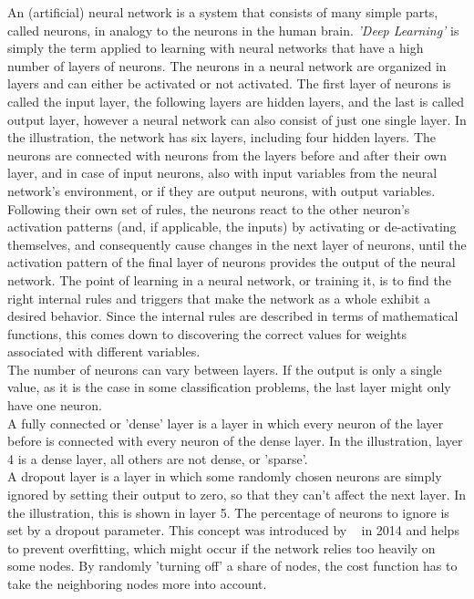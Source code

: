 \documentclass[
	a4paper,
	pagesize,
	pdftex,
	12pt,
	twoside, %
	BCOR=5mm, %
	ngerman,
	fleqn,
	final,
	]{scrartcl}
\begin{document}
An (artificial) neural network is a system that consists of many simple parts, called neurons, in analogy to the neurons in the human brain. \textit{'Deep Learning'} is simply the term applied to learning with neural networks that have a high number of layers of neurons. The neurons in a neural network are organized in layers and can either be activated or not activated. The first layer of neurons is called the input layer, the following layers are hidden layers, and the last is called output layer, however a neural network can also consist of just one single layer. In the illustration, the network has six layers, including four hidden layers. The neurons are connected with neurons from the layers before and after their own layer, and in case of input neurons, also with input variables from the neural network's environment, or if they are output neurons, with output variables. Following their own set of rules, the neurons react to the other neuron's activation patterns (and, if applicable, the inputs) by activating or de-activating themselves, and consequently cause changes in the next layer of neurons, until the activation pattern of the final layer of neurons provides the output of the neural network. The point of learning in a neural network, or training it, is to find the right internal rules and triggers that make the network as a whole exhibit a desired behavior. Since the internal rules are described in terms of mathematical functions, this comes down to discovering the correct values for weights associated with different variables.\\
The number of neurons can vary between layers. If the output is only a single value, as it is the case in some classification problems, the last layer might only have one neuron.\\
A fully connected or 'dense' layer is a layer in which every neuron of the layer before is connected with every neuron of the dense layer. In the illustration, layer 4 is a dense layer, all others are not dense, or 'sparse'.\\
A dropout layer is a layer in which some randomly chosen neurons are simply ignored by setting their output to zero, so that they can't affect the next layer. In the illustration, this is shown in layer 5. The percentage of neurons to ignore is set by a dropout parameter. This concept was introduced by ~\cite{Srivastava.2014} in 2014 and helps to prevent overfitting, which might occur if the network relies too heavily on some nodes. By randomly 'turning off' a share of nodes, the cost function has to take the neighboring nodes more into account.\\
\end{document}
